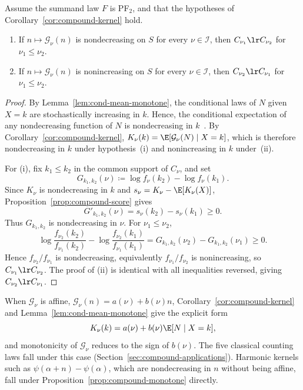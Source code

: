 \documentclass[11pt]{article}
\begin{document}
\begin{prop}
\label{prop:compound-monotone}
Assume the summand law \(F\) is PF$_2$, and that the hypotheses of Corollary~\ref{cor:compound-kernel} hold.
\begin{enumerate}[label=\textup{(\roman*)}]
\item If \(n\mapsto\mathcal G_\nu(n)\) is nondecreasing on \(S\) for every \(\nu\in\mathcal I\), then \(C_{\nu_1}\lr C_{\nu_2}\) for \(\nu_1\le\nu_2\).
\item If \(n\mapsto\mathcal G_\nu(n)\) is nonincreasing on \(S\) for every \(\nu\in\mathcal I\), then \(C_{\nu_2}\lr C_{\nu_1}\) for \(\nu_1\le\nu_2\).
\end{enumerate}
\end{prop}

\begin{proof}
By Lemma~\ref{lem:cond-mean-monotone}, the conditional laws of \(N\) given \(X=k\) are stochastically increasing in \(k\). Hence, the conditional expectation of any nondecreasing function of \(N\) is nondecreasing in \(k\)~\cite[Theorem 1.C.5]{ShakedShanthikumar}. By Corollary~\ref{cor:compound-kernel}, \(K_\nu(k)=\E[\mathcal G_\nu(N)\mid X=k]\), which is therefore nondecreasing in \(k\) under hypothesis~\textup{(i)} and nonincreasing in \(k\) under~\textup{(ii)}.

For \textup{(i)}, fix \(k_1\le k_2\) in the common support of \(C_\nu\), and set
\[
G_{k_1,k_2}(\nu)\coloneqq \log f_\nu(k_2)-\log f_\nu(k_1).
\]
Since \(K_\nu\) is nondecreasing in \(k\) and \(s_\nu=K_\nu-\E[K_\nu(X)]\), Proposition~\ref{prop:compound-score} gives
\[
G'_{k_1,k_2}(\nu)=s_\nu(k_2)-s_\nu(k_1)\ge 0.
\]
Thus \(G_{k_1,k_2}\) is nondecreasing in \(\nu\). For \(\nu_1\le\nu_2\),
\[
\log\frac{f_{\nu_2}(k_2)}{f_{\nu_1}(k_2)}
-\log\frac{f_{\nu_2}(k_1)}{f_{\nu_1}(k_1)}
=G_{k_1,k_2}(\nu_2)-G_{k_1,k_2}(\nu_1)\ge 0.
\]
Hence \(f_{\nu_2}/f_{\nu_1}\) is nondecreasing, equivalently \(f_{\nu_1}/f_{\nu_2}\) is nonincreasing, so \(C_{\nu_1}\lr C_{\nu_2}\). The proof of \textup{(ii)} is identical with all inequalities reversed, giving \(C_{\nu_2}\lr C_{\nu_1}\).
\end{proof}

\begin{rem}
	\label{rem.affine.harmonic.kernel}
When \(\mathcal G_\nu\) is affine, \(\mathcal G_\nu(n)=a(\nu)+b(\nu)n\), Corollary~\ref{cor:compound-kernel} and Lemma~\ref{lem:cond-mean-monotone} give the explicit form
\[
K_\nu(k)=a(\nu)+b(\nu)\E[N\mid X=k],
\]
and monotonicity of \(\mathcal G_\nu\) reduces to the sign of \(b(\nu)\). The five classical counting laws fall under this case (Section~\ref{sec:compound-applications}). Harmonic kernels such as \(\psi(\alpha+n)-\psi(\alpha)\), which are nondecreasing in \(n\) without being affine, fall under Proposition~\ref{prop:compound-monotone} directly.
\end{rem}
\end{document}
